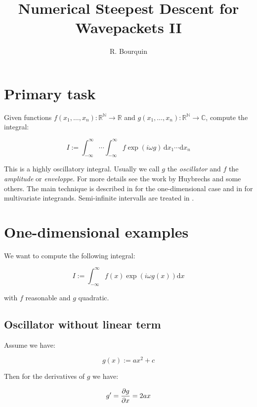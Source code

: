 \documentclass[a4paper,10pt]{article}
\title{Numerical Steepest Descent for Wavepackets II}
\author{R. Bourquin}
\begin{document}
\maketitle


\section{Primary task}

Given functions $f(x_1, \ldots, x_n):\mathbb{R^N}\rightarrow\mathbb{R}$ and
$g(x_1, \ldots, x_n):\mathbb{R^N}\rightarrow\mathbb{C}$, compute the integral:

\begin{equation} \label{eq:hoi}
 I := \int_{-\infty}^{\infty} \cdots \int_{-\infty}^{\infty} f \exp(i \omega g) \, \mathrm{d}x_1 \cdots \mathrm{d}x_n
\end{equation}

This is a highly oscillatory integral. Usually we call $g$ the \emph{oscillator}
and $f$ the \emph{amplitude} or \emph{enveloppe}. For more details see the work
by Huybrechs and some others. The main technique is described in \cite{HV_hoq} for
the one-dimensional case and in \cite{HV_cub} for multivariate integrands.
Semi-infinite intervalls are treated in \cite{H_nsd_sii}.


\section{One-dimensional examples}

We want to compute the following integral:

\begin{equation} \label{eq:oscillatory_integral}
 I := \int_{-\infty}^{\infty} f(x) \exp(i \omega g(x)) \mathrm{d}x
\end{equation}

with $f$ reasonable and $g$ quadratic.


\subsection{Oscillator without linear term}
\label{sec:scal_nlt}

Assume we have:

\begin{equation}
 g(x) := a x^2 + c
\end{equation}

Then for the derivatives of $g$ we have:

\begin{equation}
 g^\prime = \frac{\partial g}{\partial x} = 2 a x
\end{equation}
\end{document}
